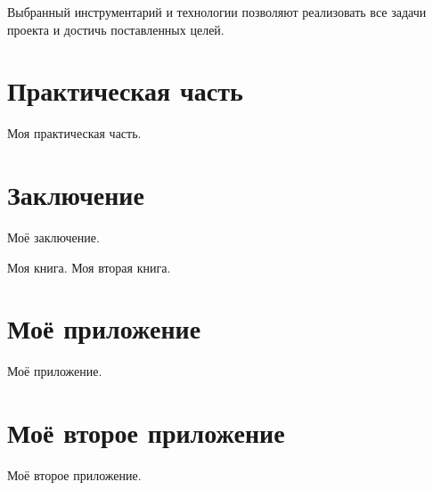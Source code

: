 \documentclass{../mirea-prog-lang}
\begin{document}
Выбранный инструментарий и технологии позволяют реализовать все задачи проекта и достичь поставленных целей.

\section{Практическая часть}

Моя практическая часть.

\section*{Заключение}
{}

Моё заключение.

\begin{thebibliography}{99\kern\bibindent}
	 Моя книга.
	 Моя вторая книга. 
\end{thebibliography}

\appendix

\section{Моё приложение}

Моё приложение.

\section{Моё второе приложение}

Моё второе приложение.
\end{document}
